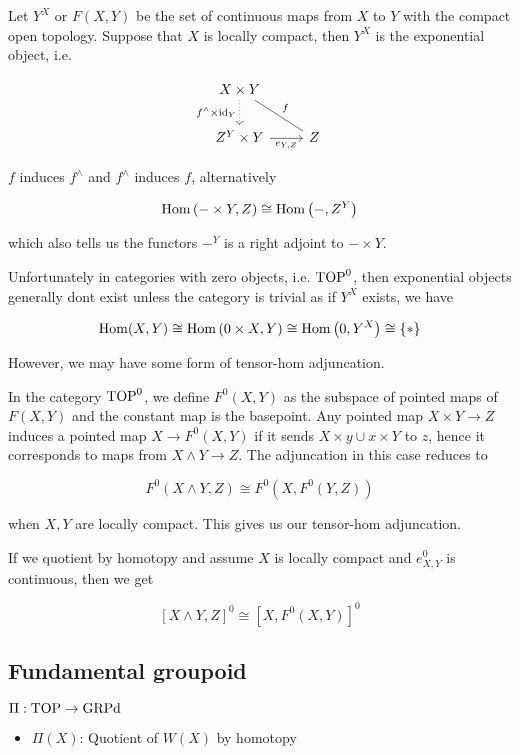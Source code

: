 Let $Y^X$ or $F(X,Y)$ be the set of continuous maps from $X$ to $Y$ with the compact open topology. Suppose that $X$ is locally compact, then $Y^X$ is the exponential object, i.e.

\[\begin{tikzcd}
    X\times Y \arrow[rd, "f", no head] \arrow[d, "f^\wedge\times\id_Y"', dotted] &   \\
    Z^Y\times Y \arrow[r, "{e_{Y,Z}}"']                                         & Z
\end{tikzcd}\]

$f$ induces $f^\wedge$ and $f^\wedge$ induces $f$, alternatively

\[\operatorname{Hom}\left(-\times Y,Z\right)\cong\operatorname{Hom}\left(-,Z^Y\right)\]

which also tells us the functors $-^Y$ is a right adjoint to $-\times Y$.

Unfortunately in categories with zero objects, i.e. $\operatorname{TOP}^0$, then exponential objects generally dont exist unless the category is trivial as if $Y^X$ exists, we have

\[\operatorname{Hom}(X,Y)\cong\operatorname{Hom}\left(0\times X,Y\right)\cong\operatorname{Hom}\left(0,Y^X\right)\cong\{*\}\]

However, we may have some form of tensor-hom adjuncation.

In the category $\operatorname{TOP}^0$, we define $F^0(X,Y)$ as the subspace of pointed maps of $F(X,Y)$ and the constant map is the basepoint. Any pointed map $X\times Y\to Z$ induces a pointed map $X\to F^0(X,Y)$ if it sends $X\times y\cup x\times Y$ to $z$, hence it corresponds to maps from $X\wedge Y\to Z$. The adjuncation in this case reduces to

\[F^0\left(X\wedge Y,Z\right)\cong F^0\left(X,F^0\left(Y,Z\right)\right)\]

when $X,Y$ are locally compact. This gives us our tensor-hom adjuncation.

If we quotient by homotopy and assume $X$ is locally compact and $e_{X,Y}^0$ is continuous, then we get

\[\left[X\wedge Y,Z\right]^0\cong\left[X,F^0(X,Y)\right]^0\]

\subsection{Fundamental groupoid}

$\Pi:\operatorname{TOP}\to\operatorname{GRPd}$
\begin{itemize}
    \item $\Pi(X)$: Quotient of $W(X)$ by homotopy
\end{itemize}

